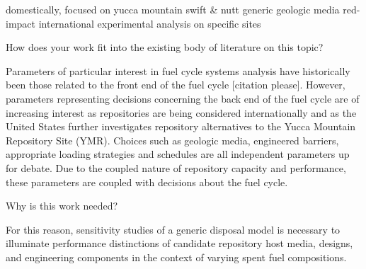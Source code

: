 domestically, focused on yucca mountain
swift & nutt
generic geologic media
red-impact international experimental analysis on specific sites 

How does your work fit into the existing body of literature on this topic? 

Parameters of particular interest in fuel cycle systems analysis have historically been those related to the front end of the fuel cycle [citation please]. However, parameters representing decisions concerning the back end of the fuel cycle are of increasing interest as repositories are being considered internationally and as the United States further investigates repository alternatives to the Yucca Mountain Repository Site (YMR). Choices such as geologic media, engineered barriers, appropriate loading strategies and schedules are all independent parameters up for debate. Due to the coupled nature of repository capacity and performance, these parameters are coupled with decisions about the fuel cycle.


Why is this work needed?

For this reason, sensitivity studies of a generic disposal model is necessary to illuminate performance distinctions of candidate repository host media, designs, and engineering components in the context of varying spent fuel compositions. 
